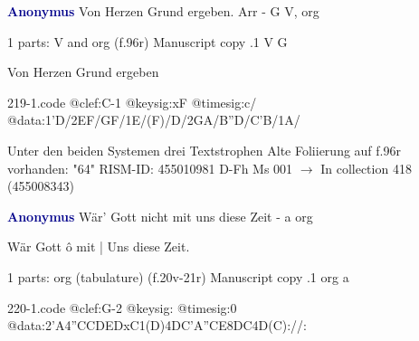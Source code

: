 \documentclass[twocolumn]{book}
\begin{document}
\newline \par \vspace{7pt} \textcolor{darkblue}{\textbf{Anonymus  }}
\newline Von Herzen Grund ergeben. Arr - G
\newline V, org
\newline \begin{itshape}\end{itshape} 
\newline \textcolor{darkblue}{}  1 parts: V and org  (f.96r)
\newline Manuscript copy
.1  V  G
\newline \begin{footnotesize} Von Herzen Grund ergeben \end{footnotesize}  
\begin{filecontents*}{219-1.code}
@clef:C-1
@keysig:xF
@timesig:c/
@data:1'D/2EF/GF/1E/(F)/D/2GA/B''D/C'B/1A/
\end{filecontents*}
\newline
%

\newline Unter den beiden Systemen drei Textstrophen
\newline Alte Foliierung auf f.96r vorhanden: "64"
\newline RISM-ID: 455010981
\newline D-Fh  Ms 001
\newline $\rightarrow$ In collection 418 (455008343)
      
\newline \par \vspace{7pt} \textcolor{darkblue}{\textbf{Anonymus  }}
\newline Wär' Gott nicht mit uns diese Zeit - a
\newline org
\newline \begin{itshape}[f.20v, at left:] Wär Gott ô mit | Uns diese Zeit.\end{itshape} 
\newline \textcolor{darkblue}{}  1 parts: org (tabulature)  (f.20v-21r)
\newline Manuscript copy
.1  org  a  
\begin{filecontents*}{220-1.code}
@clef:G-2
@keysig:
@timesig:0
@data:2'A4''CCDEDxC1(D)4DC'A''CE{8DC}4D(C)://:
\end{filecontents*}
\newline
%
\end{document}
